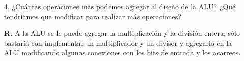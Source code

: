 \documentclass[12pt, letterpaper]{article}
\begin{document}
\begin{itemize}
          \item[4.] ¿Cuántas operaciones más podemos agregar al diseño de la ALU?
                    ¿Qué tendríamos que modificar para realizar más operaciones? \vspace{.2cm}

                    \textbf{R.} A la ALU se le puede agregar la multiplicación y
                                la división entera; sólo bastaría con implementar
                                un multiplicador y un divisor y agregarlo en la
                                ALU modificando algunas conexiones con los bits
                                de entrada y los acarreos.
        \end{itemize}

  
\end{document}
